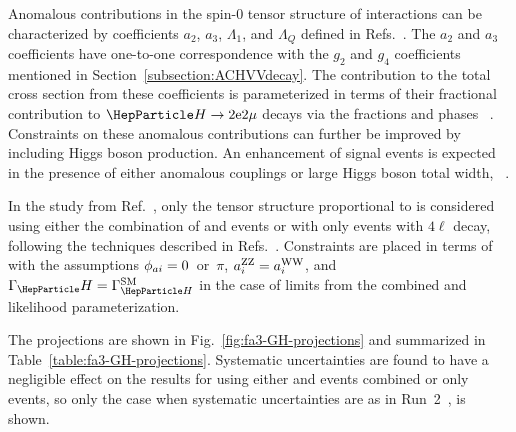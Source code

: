 Anomalous contributions in the spin-0 tensor structure of \HVV interactions can be characterized by coefficients $a_2$, $a_3$, $\Lambda_1$, and $\Lambda_Q$ defined in Refs.~\cite{Khachatryan:2014kca, Khachatryan:2015mma}. The $a_2$ and $a_3$ coefficients have one-to-one correspondence with the $g_2$ and $g_4$ coefficients mentioned in Section~\ref{subsection:ACHVVdecay}.
The contribution to the total cross section from these coefficients is parameterized in terms of their fractional contribution to \onshell $\PH\to2\mathrm{e}2\mathrm{\mu}$ decays via the fractions \fai and phases \pai~\cite{Khachatryan:2014kca, Khachatryan:2015mma}.
Constraints on these anomalous contributions can further be improved by including \offshell Higgs boson production. An enhancement of signal events is expected in the presence of either anomalous \HVV couplings or large Higgs boson total width, \GH~\cite{Khachatryan:2015mma,deFlorian:2016spz,CMS-PAS-HIG-18-002}.

In the study from Ref.~\cite{CMS-PAS-FTR-18-011}, only the tensor structure proportional to  is considered using either the combination of \onshell and \offshell events or with only \onshell events with $4\ell$ decay, following the techniques described in Refs.~\cite{Khachatryan:2014kca,deFlorian:2016spz,CMS-PAS-HIG-18-002}. Constraints are placed in terms of \fcospai with the assumptions $\phi_{a i}=0$~or~$\pi$, $a_{i}^\mathrm{ZZ}=a_{i}^\mathrm{WW}$, and ${\GH}={\GHSM}$ in the case of limits from the combined \onshell and \offshell likelihood parameterization.

The projections are shown in Fig.~\ref{fig:fa3-GH-projections} and summarized in Table~\ref{table:fa3-GH-projections}. Systematic uncertainties are found to have a negligible effect on the results for  using either \onshell and \offshell events combined or only \onshell events, so only the case when systematic uncertainties are as in Run~2~\cite{CMS-PAS-HIG-18-002}, is shown.

